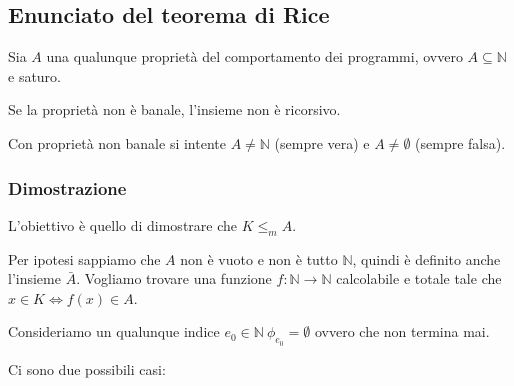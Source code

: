 \subsection{Enunciato del teorema di Rice}

Sia $ A $ una qualunque proprietà del comportamento dei programmi, ovvero $ A \subseteq \mathbb{N} $ e saturo.

Se la proprietà non è banale, l'insieme non è ricorsivo.

Con proprietà non banale si intente $ A \neq \mathbb{N}$ (sempre vera) e $ A \neq \emptyset $ (sempre falsa).

\subsubsection{Dimostrazione}

L'obiettivo è quello di dimostrare che $ K \leq_m A $.

Per ipotesi sappiamo che $ A $ non è vuoto e non è tutto $ \mathbb{N} $, quindi è definito anche l'insieme $ \bar{A} $.
Vogliamo trovare una funzione $ f : \mathbb{N} \rightarrow \mathbb{N} $ calcolabile e totale tale che $ x \in K \Leftrightarrow f(x) \in A$.

Consideriamo un qualunque indice $ e_0 \in \mathbb{N} \: \phi_{e_0} = \emptyset$ ovvero che non termina mai.

Ci sono due possibili casi:

